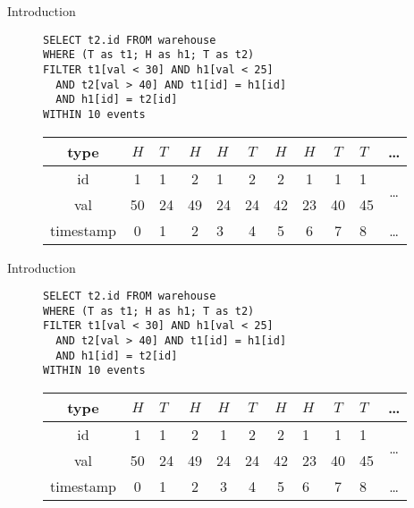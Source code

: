 \documentclass[xcolor=pdftex,dvipsnames,table]{beamer}
\begin{document}
\begin{frame}[fragile]{Introduction}
 \begin{example}{}
    \begin{figure}[H]
      \begin{verbatim}
SELECT t2.id FROM warehouse
WHERE (T as t1; H as h1; T as t2)
FILTER t1[val < 30] AND h1[val < 25]
  AND t2[val > 40] AND t1[id] = h1[id]
  AND h1[id] = t2[id]
WITHIN 10 events
      \end{verbatim}
    \end{figure}
    \begin{figure}[H]
      \centering
      \begin{tabular}{|c|c|a|c|a|c|c|c|c|a|c}\hline
        type  &$H$&$T$&$H$&$H$&$T$&$H$&$H$&$T$&$T$ & \ldots \\ \hline
        id  & 1 & 1 & 2 & 1 & 2 & 2 & 1 & 1 & 1 &  \\
        val & 50 & 24& 49& 24& 24& 42& 23& 40& 45\\ \hline
        timestamp & 0 & 1 & 2 & 3 & 4 & 5 & 6 & 7 & 8 & \ldots \\ \hline
      \end{tabular}
    \end{figure}
 \end{example}
\end{frame}

\begin{frame}[fragile]{Introduction}
 \begin{example}{}
    \begin{figure}[H]
      \begin{verbatim}
SELECT t2.id FROM warehouse
WHERE (T as t1; H as h1; T as t2)
FILTER t1[val < 30] AND h1[val < 25]
  AND t2[val > 40] AND t1[id] = h1[id]
  AND h1[id] = t2[id]
WITHIN 10 events
      \end{verbatim}
    \end{figure}
    \begin{figure}[H]
      \centering
      \begin{tabular}{|c|c|a|c|c|c|c|a|c|a|c}\hline
        type  &$H$&$T$&$H$&$H$&$T$&$H$&$H$&$T$&$T$ & \ldots \\ \hline
        id  & 1 & 1 & 2 & 1 & 2 & 2 & 1 & 1 & 1 &  \\
        val & 50 & 24& 49& 24& 24& 42& 23& 40& 45\\ \hline
        timestamp & 0 & 1 & 2 & 3 & 4 & 5 & 6 & 7 & 8 & \ldots \\ \hline
      \end{tabular}
    \end{figure}
 \end{example}
\end{frame}
\end{document}
